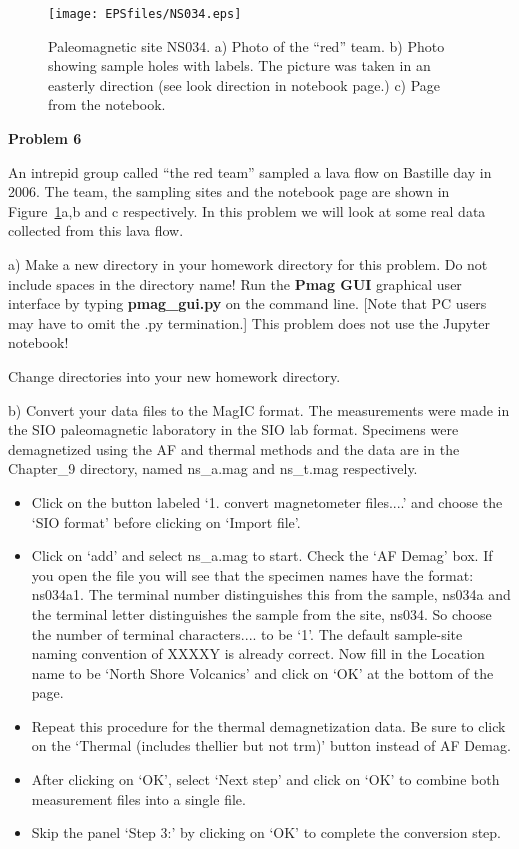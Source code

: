 {\begin{figure}[h!tb]
\centering  \texttt{[image: EPSfiles/NS034.eps]}
\caption{Paleomagnetic site NS034. a) Photo of the ``red'' team.  b) Photo showing sample holes with labels. The picture was taken in an easterly direction (see look direction in notebook page.)   c) Page from the notebook.  }
\label{fig:ns34}
\end{figure}


{\bf Problem 6}



 An intrepid group called ``the red team'' sampled a lava flow on Bastille day in 2006.  The team, the sampling sites and the notebook page are shown in Figure~\ref{fig:ns34}a,b and c respectively. 
In this problem we will look at some real data collected from this lava flow.  


a) Make a  new directory in your homework directory for this problem.   Do not include spaces in the directory name!
Run the {\bf Pmag GUI} graphical user interface by typing {\bf pmag\_gui.py} on the command line.  [Note that PC users may have to omit the .py termination.]  This problem does not use the Jupyter notebook!

Change directories into your new homework directory.  

b) Convert your data files to the MagIC format.   The measurements were made in the SIO paleomagnetic laboratory in the SIO lab format.  Specimens were demagnetized using the AF and thermal methods and the data are in the Chapter\_9 directory, named ns\_a.mag and ns\_t.mag respectively.  

\begin{itemize}
\item  Click on the button labeled `1. convert magnetometer files....'  and choose the `SIO format' before clicking on `Import file'.   
\item Click on `add'  and select ns\_a.mag to start.  Check the `AF Demag' box.  If you open the file you will see that the specimen names have the format:  ns034a1.   The terminal number distinguishes this from the sample, ns034a and the terminal letter distinguishes the sample from the site, ns034.  So choose the number of terminal characters....  to be `1'.  The default sample-site naming convention of XXXXY is already correct.  Now fill in the Location name to be `North Shore Volcanics' and click on `OK' at the bottom of the page.  
\item  Repeat this procedure for the thermal demagnetization data.  Be sure to click on the `Thermal (includes thellier but not trm)' button instead of AF Demag.  
\item After clicking on `OK', select `Next step'  and click on 	`OK'  to combine both measurement files into a single file.  
\item Skip the panel `Step 3:' by clicking on `OK'  to complete the conversion step.   
\end{itemize}

}
